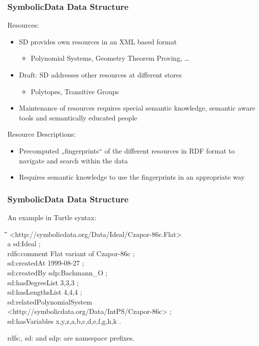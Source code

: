 \documentclass{beamer}
\newenvironment{code}{\footnotesize\tt \begin{tabbing}
\hskip12pt\=\hskip12pt\=\hskip12pt\=\hskip12pt\=\hskip5cm\=\hskip5cm\=\kill}
{\end{tabbing}}
\begin{document}
\begin{frame}\frametitle{SymbolicData Data Structure}
Resources:
\begin{itemize}
\item SD provides own resources in an XML based format
\begin{itemize}
\item Polynomial Systems, Geometry Theorem Proving, \ldots
\end{itemize}
\item Draft: SD addresses other resources at different stores
\begin{itemize}
\item Polytopes, Transitive Groups
\end{itemize}
\item Maintenance of resources requires special semantic knowledge, semantic
  aware tools and semantically educated people
\end{itemize}
Resource Descriptions: 
\begin{itemize}
\item Precomputed „fingerprints“ of the different resources in RDF format to
  navigate and search within the data
\item Requires semantic knowledge to use the fingerprints in an appropriate
  way
\end{itemize}
\end{frame}

\begin{frame}\frametitle{SymbolicData Data Structure}
An example in Turtle syntax:

\begin{code}
  <http://symbolicdata.org/Data/Ideal/Czapor-86c.Flat> \+\\
  a sd:Ideal ;\\
  rdfs:comment {\dq}Flat variant of Czapor-86c{\dq} ;\\
  sd:createdAt {\dq}1999-08-27{\dq} ;\\
  sd:createdBy sdp:Bachmann\_O ;\\
  sd:hasDegreeList {\dq}3,3,3{\dq} ;\\
  sd:hasLengthsList {\dq}4,4,4{\dq} ;\\
  sd:relatedPolynomialSystem\\\>
  <http://symbolicdata.org/Data/IntPS/Czapor-86c> ;\\
  sd:hasVariables {\dq}x,y,z,a,b,c,d,e,f,g,h,k{\dq} .
\end{code}
rdfs:, sd: and sdp: are namespace prefixes.
\end{frame}
\end{document}
